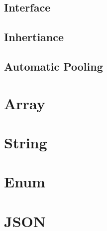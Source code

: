 \documentclass[12pt,letterpaper]{report}
\begin{document}
\subsection{Interface}
\subsection{Inhertiance}
\subsection{Automatic Pooling}
\section{Array}
\section{String}
\section{Enum}
\section{JSON}
\end{document}
